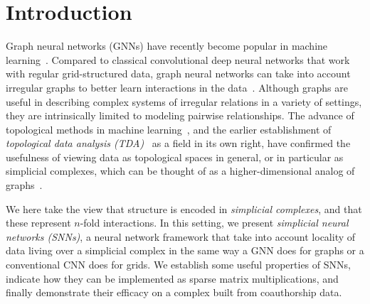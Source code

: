\section{Introduction}

Graph neural networks (GNNs) have recently become popular in machine learning~\cite{defferrard2016convolutional, bronstein2017geometric, wu2020survey}.
Compared to classical convolutional deep neural networks that work with regular grid-structured data, graph neural networks can take into account irregular graphs to better learn interactions in the data~\cite{battaglia2018relational}. Although graphs are useful in describing complex systems of irregular relations in a variety of settings, they are intrinsically limited to modeling pairwise relationships. The advance of topological methods in machine learning~\cite{Gabrielsson2020topological, Hofer2019LearningRO, rieck2018neural}, and the earlier establishment of \emph{topological data analysis (TDA)}~\cite{carlsson2008,chazal2017,edelsbrunner2010computational,ghrist2008barcodes} as a field in its own right, have confirmed the usefulness of viewing data as topological spaces in general, or in particular as simplicial complexes, which can be thought of as a higher-dimensional analog of graphs~\cite{moore2012,patania2017}.

We here take the view that structure is encoded in \emph{simplicial complexes}, and that these represent $n$-fold interactions. In this setting, we present \emph{simplicial neural networks (SNNs)}, a neural network framework that take into account locality of data living over a simplicial complex in the same way a GNN does for graphs or a conventional CNN does for grids.
We establish some useful properties of SNNs, indicate how they can be implemented as sparse matrix multiplications, and finally demonstrate their efficacy on a complex built from coauthorship data.

